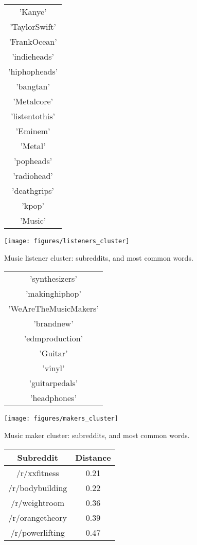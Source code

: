 \documentclass[]{article}
\begin{document}
	\begin{figure}[htbp!]
		\centering
\begin{tabular}{c}
'Kanye' \\
 'TaylorSwift' \\
 'FrankOcean' \\
 'indieheads' \\
 'hiphopheads' \\
 'bangtan' \\
 'Metalcore' \\
 'listentothis' \\
 'Eminem' \\
 'Metal' \\
 'popheads' \\
 'radiohead' \\
 'deathgrips' \\
 'kpop' \\
 'Music'
 \end{tabular}
		\texttt{[image: figures/listeners\_cluster]}
		\caption{Music listener cluster: subreddits, and most common words.}
		\label{fig:listener}
	\end{figure}

	\begin{figure}[htbp!]
		\centering
\begin{tabular}{c}
'synthesizers' \\
 'makinghiphop' \\
 'WeAreTheMusicMakers' \\
 'brandnew' \\
 'edmproduction' \\
 'Guitar' \\
 'vinyl' \\
 'guitarpedals' \\
 'headphones'
 \end{tabular}
		\texttt{[image: figures/makers\_cluster]}
		\caption{Music maker cluster: subreddits, and most common words.}
		\label{fig:maker}
	\end{figure}
	
\begin{figure}[htbp!]
	\centering
\begin{tabular}{c|c}
Subreddit & Distance \\
\midrule
/r/xxfitness & 0.21\\
/r/bodybuilding & 0.22\\
/r/weightroom & 0.36\\
/r/orangetheory & 0.39\\
/r/powerlifting & 0.47
\end{tabular}
	\caption{}
	\label{fig:recommendation}
\end{figure}	
\end{document}
